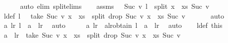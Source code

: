 \begin{isabellebody}
\ \ \ \ \isamarkupfalse%
\ {\isacharparenleft}{\kern0pt}auto\ elim{\isacharcolon}{\kern0pt}\ split{\isachardot}{\kern0pt}elims{\isacharparenright}{\kern0pt}\isanewline
\ \ \isamarkupfalse%
\ assms{\isacharcolon}{\kern0pt}\ {\isachardoublequoteopen}{}\ {\isacharless}{\kern0pt}\ Suc\ v{\isachardoublequoteclose}\ {\isachardoublequoteopen}l\ {\isacharequal}{\kern0pt}\ split\ {\isacharparenleft}{\kern0pt}x\ {\isacharhash}{\kern0pt}\ xs{\isacharparenright}{\kern0pt}\ {\isacharparenleft}{\kern0pt}Suc\ v{\isacharparenright}{\kern0pt}{\isachardoublequoteclose}\isanewline
\ \ \isamarkupfalse%
\ \isamarkupfalse%
\ l{\isacharunderscore}{\kern0pt}def{\isacharcolon}{\kern0pt}\ {\isachardoublequoteopen}l\ {\isacharequal}{\kern0pt}\ \ {\isacharparenleft}{\kern0pt}take\ {\isacharparenleft}{\kern0pt}Suc\ v{\isacharparenright}{\kern0pt}\ {\isacharparenleft}{\kern0pt}x\ {\isacharhash}{\kern0pt}\ xs{\isacharparenright}{\kern0pt}{\isacharparenright}{\kern0pt}\ {\isacharhash}{\kern0pt}\ {\isacharparenleft}{\kern0pt}split\ {\isacharparenleft}{\kern0pt}drop\ {\isacharparenleft}{\kern0pt}Suc\ v{\isacharparenright}{\kern0pt}\ {\isacharparenleft}{\kern0pt}x\ {\isacharhash}{\kern0pt}\ xs{\isacharparenright}{\kern0pt}{\isacharparenright}{\kern0pt}\ {\isacharparenleft}{\kern0pt}Suc\ v{\isacharparenright}{\kern0pt}{\isacharparenright}{\kern0pt}{\isachardoublequoteclose}\ \isanewline
\ \ \ \ \isamarkupfalse%
\ auto\isanewline
\ \ \isamarkupfalse%
\ \isamarkupfalse%
\ {\isachardoublequoteopen}{\isasymexists}a\ l{\isacharunderscore}{\kern0pt}r{\isachardot}{\kern0pt}\ l\ {\isacharequal}{\kern0pt}\ a\ {\isacharhash}{\kern0pt}\ l{\isacharunderscore}{\kern0pt}r{\isachardoublequoteclose}\ \isamarkupfalse%
\ auto\isanewline
\ \ \isamarkupfalse%
\ \isamarkupfalse%
\ a\ l{\isacharunderscore}{\kern0pt}r\ \ a{\isacharunderscore}{\kern0pt}l{\isacharunderscore}{\kern0pt}r{\isacharunderscore}{\kern0pt}obtain{\isacharcolon}{\kern0pt}\ {\isachardoublequoteopen}l\ {\isacharequal}{\kern0pt}\ a\ {\isacharhash}{\kern0pt}\ l{\isacharunderscore}{\kern0pt}r{\isachardoublequoteclose}\ \isamarkupfalse%
\ auto\isanewline
\ \ \isamarkupfalse%
\ l{\isacharunderscore}{\kern0pt}def\ this\ \isamarkupfalse%
\ {\isachardoublequoteopen}a\ {\isacharhash}{\kern0pt}\ l{\isacharunderscore}{\kern0pt}r\ {\isacharequal}{\kern0pt}\ {\isacharparenleft}{\kern0pt}take\ {\isacharparenleft}{\kern0pt}Suc\ v{\isacharparenright}{\kern0pt}\ {\isacharparenleft}{\kern0pt}x\ {\isacharhash}{\kern0pt}\ xs{\isacharparenright}{\kern0pt}{\isacharparenright}{\kern0pt}\ {\isacharhash}{\kern0pt}\ {\isacharparenleft}{\kern0pt}split\ {\isacharparenleft}{\kern0pt}drop\ {\isacharparenleft}{\kern0pt}Suc\ v{\isacharparenright}{\kern0pt}\ {\isacharparenleft}{\kern0pt}x\ {\isacharhash}{\kern0pt}\ xs{\isacharparenright}{\kern0pt}{\isacharparenright}{\kern0pt}\ {\isacharparenleft}{\kern0pt}Suc\ v{\isacharparenright}{\kern0pt}{\isacharparenright}{\kern0pt}{\isachardoublequoteclose}\isanewline

\end{isabellebody}

